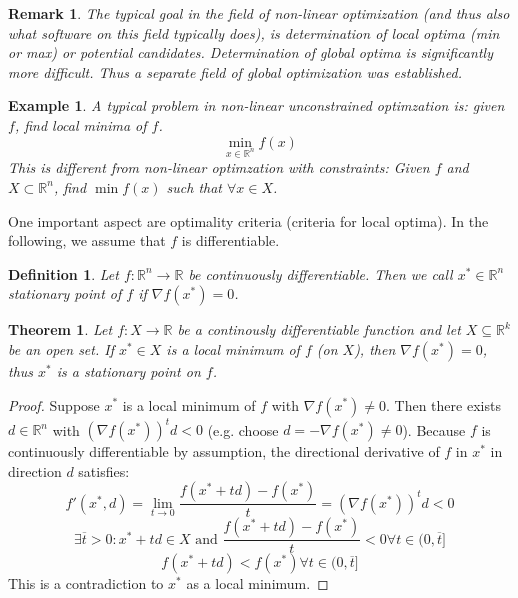 \documentclass[a4paper]{article}
\newcounter{lecref}[subsection]
\numberwithin{lecref}{subsection}
\newtheorem{theorem}[lecref]{Theorem}
\newtheorem*{Example}{Example}
\newtheorem*{Definition}{Definition}
\newtheorem*{Remark}{Remark}
\begin{document}
\begin{Remark}
	The typical goal in the field of non-linear optimization (and thus also what software on this field typically does), is determination of local optima (min or max) or potential candidates. Determination of global optima is significantly more difficult. Thus a separate field of global optimization was established.
\end{Remark}

\begin{Example}
	A typical problem in non-linear unconstrained optimzation is: given $f$, find local minima of $f$.
	\[ \min_{x \in \mathbb R^n} f(x) \]
	This is different from non-linear optimzation \emph{with} constraints:
	Given $f$ and $X \subset \mathbb R^n$, find $\min f(x)$ such that $\forall x \in X$.
\end{Example}

One important aspect are optimality criteria (criteria for local optima).
In the following, we assume that $f$ is differentiable.

\begin{Definition}
	Let $f: \mathbb R^n \to \mathbb R$ be continuously differentiable. Then we call $x^* \in \mathbb R^n$ \emph{stationary point} of $f$ if $\nabla f(x^*) = 0$.
\end{Definition}

\begin{theorem}
	\label{theorem:2.1.1}
	Let $f: X \to \mathbb R$ be a continously differentiable function and let $X \subseteq \mathbb R^k$ be an open set. If $x^* \in X$ is a local minimum of $f$ (on $X$), then $\nabla f(x^*) = 0$, thus $x^*$ is a stationary point on $f$.
\end{theorem}

\begin{proof}
	Suppose $x^*$ is a local minimum of $f$ with $\nabla f(x^*) \neq 0$.
	Then there exists $d \in \mathbb R^n$ with $(\nabla f(x^*))^t d < 0$ (e.g. choose $d = -\nabla f(x^*) \neq 0$).
	Because $f$ is continuously differentiable by assumption, the directional derivative of $f$ in $x^*$ in direction $d$ satisfies:
	\[ f'(x^*, d) = \lim_{t \to 0} \frac{f(x^* + td) - f(x^*)}{t} = \left(\nabla f(x^*)\right)^t d < 0 \]
	\[ \exists \overline{t} > 0: x^* + td \in X \text{ and } \frac{f(x^* + td) - f(x^*)}{t} < 0 \forall t \in (0, \overline{t}] \]
	\[ f(x^* + td) < f(x^*) \forall t \in (0, \overline t] \]
	This is a contradiction to $x^*$ as a local minimum.
\end{proof}
\end{document}
